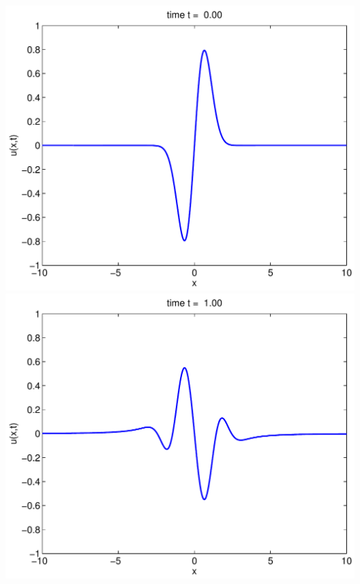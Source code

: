 {\begin{solution}
\begin{enumerate}
\newpage
      \begin{center}
          \includegraphics[scale=0.36]{dalembert0}\quad
          \includegraphics[scale=0.36]{dalembert1}


\end{center}
\end{enumerate}
\end{solution}}
